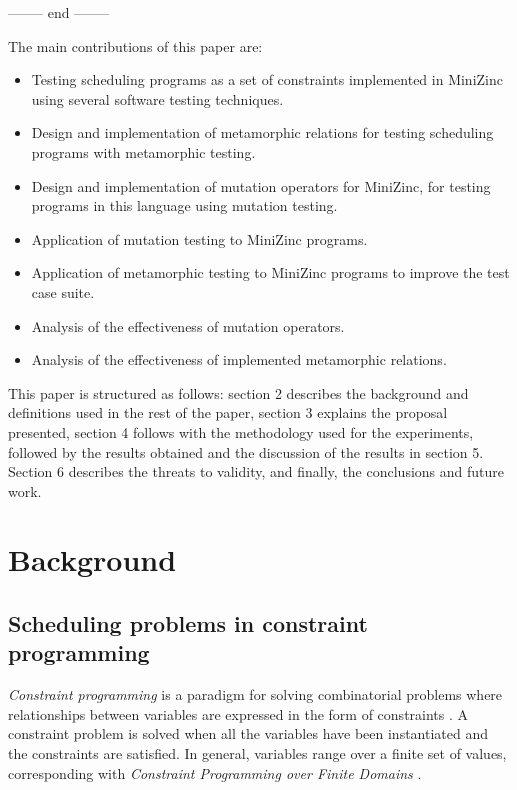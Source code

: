 -------- end --------




The main contributions of this paper are:
\begin{itemize}
    \item Testing scheduling programs as a set of constraints implemented in MiniZinc using several software testing techniques.
    \item Design and implementation of metamorphic relations for testing scheduling programs with metamorphic testing.
    \item Design and implementation of mutation operators for MiniZinc, for testing programs in this language using mutation testing.
    \item Application of mutation testing to MiniZinc programs.
    \item Application of metamorphic testing to MiniZinc programs to improve the test case suite.
    \item Analysis of the effectiveness of mutation operators.
    \item Analysis of the effectiveness of implemented metamorphic relations.
\end{itemize}

This paper is structured as follows: section 2 describes the background and definitions used in the rest of the paper, section 3 explains the proposal presented, section 4 follows with the methodology used for the experiments, followed by the results obtained and the discussion of the results in section 5. Section 6 describes the threats to validity, and finally, the conclusions and future work.


\section{Background}



\subsection{Scheduling problems in constraint programming}

\textit{Constraint programming} is a paradigm for solving combinatorial problems where relationships between variables are expressed in the form of constraints \citep{rbw06}.
A constraint problem is solved when all the variables have been instantiated and the constraints are satisfied. In general, variables range over a finite set of values, corresponding with \textit{Constraint Programming over Finite Domains} \cite{schulte2006finite}.


